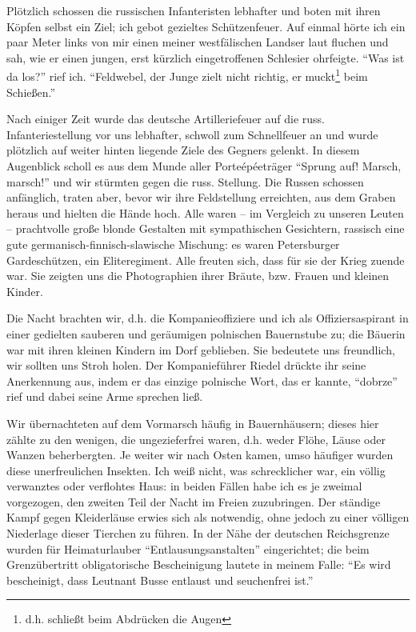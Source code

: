 Plötzlich schossen die russischen Infanteristen lebhafter und boten mit ihren Köpfen selbst ein Ziel; ich gebot gezieltes Schützenfeuer. Auf einmal hörte ich ein paar Meter links von mir einen meiner westfälischen Landser laut fluchen und sah, wie er einen jungen, erst kürzlich eingetroffenen Schlesier ohrfeigte. \enquote{Was ist da los?} rief ich. \enquote{Feldwebel, der Junge zielt nicht richtig, er muckt\footnote{d.h. schließt beim Abdrücken die Augen} beim Schießen.}

Nach einiger Zeit wurde das deutsche Artilleriefeuer auf die russ. Infanteriestellung vor uns lebhafter, schwoll zum Schnellfeuer an und wurde plötzlich auf weiter hinten liegende Ziele des Gegners gelenkt. In diesem Augenblick scholl es aus dem Munde aller Porteépéeträger \enquote{Sprung auf! Marsch, marsch!} und wir stürmten gegen die russ. Stellung. Die Russen schossen anfänglich, traten aber, bevor wir ihre Feldstellung erreichten, aus dem Graben heraus und hielten die Hände hoch. Alle waren -- im Vergleich zu unseren Leuten -- prachtvolle große blonde Gestalten mit sympathischen Gesichtern, rassisch eine gute germanisch-finnisch-slawische Mischung: es waren Petersburger Gardeschützen, ein Eliteregiment. Alle freuten sich, dass für sie der Krieg zuende war. Sie zeigten uns die Photographien ihrer Bräute, bzw. Frauen und kleinen Kinder.

Die Nacht brachten wir, d.h. die Kompanieoffiziere und ich als Offiziersaspirant in einer gedielten sauberen und geräumigen polnischen Bauernstube zu; die Bäuerin war mit ihren kleinen Kindern im Dorf geblieben. Sie bedeutete uns freundlich, wir sollten uns Stroh holen. Der Kompanieführer Riedel drückte ihr seine Anerkennung aus, indem er das einzige polnische Wort, das er kannte, \enquote{dobrze} rief und dabei seine Arme sprechen ließ.

Wir übernachteten auf dem Vormarsch häufig in Bauernhäusern; dieses hier zählte zu den wenigen, die ungezieferfrei waren, d.h. weder Flöhe, Läuse oder Wanzen beherbergten. Je weiter wir nach Osten kamen, umso häufiger wurden diese unerfreulichen Insekten. Ich weiß nicht, was schrecklicher war, ein völlig verwanztes oder verflohtes Haus: in beiden Fällen habe ich es je zweimal vorgezogen, den zweiten Teil der Nacht im Freien zuzubringen. Der ständige Kampf gegen Kleiderläuse erwies sich als notwendig, ohne jedoch zu einer völligen Niederlage dieser Tierchen zu führen. In der Nähe der deutschen Reichsgrenze wurden für Heimaturlauber \enquote{Entlausungsanstalten} eingerichtet; die beim Grenzübertritt obligatorische Bescheinigung lautete in meinem Falle: \enquote{Es wird bescheinigt, dass Leutnant Busse entlaust und seuchenfrei ist.}

